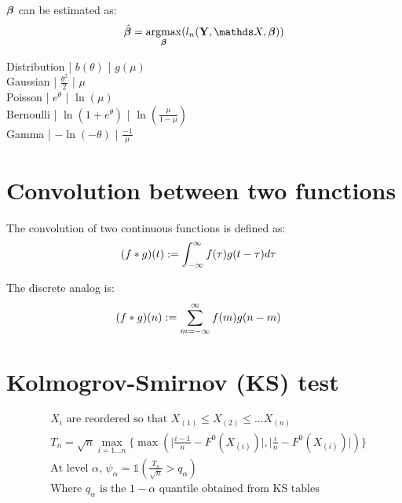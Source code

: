$\bm{\beta}$ can be estimated as:
\begin {equation} \begin {split}
& \hat \vbeta = \argmax_{\vbeta} (l_n(\vY, \mX, \vbeta)) \\
\end {split} \end {equation}

 Distribution | $b(\theta)$ | $g(\mu)$ \\
 Gaussian | $ \frac {\theta^2} {2}$ | $ \mu $ \\
 Poisson | $ e^{\theta} $ | $ \ln(\mu) $ \\
 Bernoulli | $ \ln (1 + e^{\theta}) $ | $ \ln (\frac {\mu} {1 - \mu}) $ \\
 Gamma | $ -\ln (-\theta) $ | $ \frac {-1} {\mu} $ \\

\section {Convolution between two functions} 
The convolution of two continuous functions is defined as:
\begin{equation} \begin {split}
& ({f * g}) (t) := \int_{- \infty}^{\infty} f(\tau) g(t - \tau) d\tau
\end {split} \end{equation} 

The discrete analog is:
\begin{equation} \begin {split}
& ({f * g}) (n) := \sum_{m = -\infty}^{\infty} f(m) g(n - m)
\end {split} \end{equation}

\section {Kolmogrov-Smirnov (KS) test}
\begin {equation} 
\begin {split}
& \text {$X_i$ are reordered so that } X_{(1)} \le X_{(2)} \le ... X_{(n)} \\
& T_n = \sqrt{n} \max \limits_{i=1...n} \{ \max (\lvert \frac {i-1}{n} - F^0(X_{(i)}) \rvert , \lvert \frac {i}{n} - F^0(X_{(i)}) \rvert ) \} \\
& \text {At level $\alpha$, } \psi_{\alpha}  = \mathds{1} (\frac {T_n}{\sqrt{n}} > q_{\alpha}) \\
& \text {Where $q_{\alpha}$ is the $1 - \alpha$ quantile obtained from KS tables} \\
\end {split}
\end {equation}

